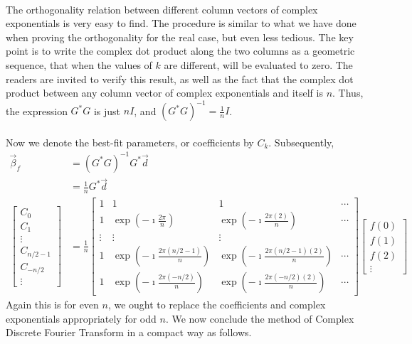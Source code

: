 \\
The orthogonality relation between different column vectors of complex exponentials is very easy to find. The procedure is similar to what we have done when proving the orthogonality for the real case, but even less tedious. The key point is to write the complex dot product along the two columns as a geometric sequence, that when the values of $k$ are different, will be evaluated to zero. The readers are invited to verify this result, as well as the fact that the complex dot product between any column vector of complex exponentials and itself is $n$. Thus, the expression $G^*G$ is just $nI$, and $(G^*G)^{-1} = \frac{1}{n} I$.\\
\\
Now we denote the best-fit parameters, or coefficients by $C_k$. Subsequently,
\begin{align*}
\vec{\beta}_f &= (G^*G)^{-1}G^*\vec{d} \\
&= \frac{1}{n}G^*\vec{d} \\
\begin{bmatrix}
C_0 \\
C_1 \\
\vdots \\
C_{n/2-1} \\
C_{-n/2} \\
\vdots
\end{bmatrix}
&= 
\frac{1}{n}
\begin{bmatrix}
1 & 1 & 1 & \cdots \\
1 & \exp(-\imath\frac{2\pi}{n}) & \exp(-\imath\frac{2\pi(2)}{n}) & \cdots \\
\vdots & \vdots & \vdots & \\
1 & \exp(-\imath\frac{2\pi(n/2-1)}{n}) & \exp(-\imath\frac{2\pi(n/2-1)(2)}{n}) & \cdots \\
1 & \exp(-\imath\frac{2\pi(-n/2)}{n}) & \exp(-\imath\frac{2\pi(-n/2)(2)}{n}) & \cdots 
\end{bmatrix}
\begin{bmatrix}
f(0) \\
f(1) \\
f(2) \\
\vdots
\end{bmatrix}
\end{align*}
Again this is for even $n$, we ought to replace the coefficients and complex exponentials appropriately for odd $n$. We now conclude the method of Complex Discrete Fourier Transform in a compact way as follows.
